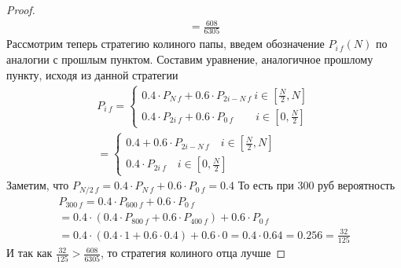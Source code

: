 \begin{proof}
\begin{gather*}
            = \frac{608}{6305}
        \end{gather*}
        \vskip 0.2in
        Рассмотрим теперь стратегию колиного папы, введем обозначение $P_{i\ f}(N)$ по аналогии с прошлым пунктом. Составим уравнение, аналогичное прошлому пункту, исходя из данной стратегии
        \begin{gather*}
            P_{i\ f} =
            \begin{cases}
                0.4 \cdot P_{N\ f} + 0.6 \cdot P_{2i-N\ f}
                \ i \in [\frac{N}{2}, N]\\
                0.4 \cdot P_{2i\ f} + 0.6 \cdot P_{0\ f}
                \qquad i \in [0,\frac{N}{2}]
            \end{cases}\\
            =
            \begin{cases}
                0.4 + 0.6 \cdot P_{2i-N\ f}
                \quad i \in [\frac{N}{2}, N]\\
                0.4 \cdot P_{2i\ f}
                \quad i \in [0,\frac{N}{2}]
            \end{cases}
        \end{gather*}
        Заметим, что $P_{N/2\ f} = 0.4 \cdot P_{N\ f} + 0.6 \cdot P_{0\ f} = 0.4$
        То есть при 300 руб вероятность
        \begin{gather*}
            P_{300\ f}
            = 0.4 \cdot P_{600\ f} + 0.6 \cdot P_{0\ f}\\
            = 0.4 \cdot (0.4 \cdot P_{800\ f} + 0.6 \cdot P_{400\ f}) + 0.6 \cdot P_{0\ f}\\
            = 0.4 \cdot (0.4 \cdot 1 + 0.6 \cdot 0.4) + 0.6 \cdot 0
            = 0.4 \cdot 0.64
            = 0.256
            = \frac{32}{125}
        \end{gather*}
        И так как $\frac{32}{125} > \frac{608}{6305}$, то стратегия колиного отца лучше 
    \end{proof}
